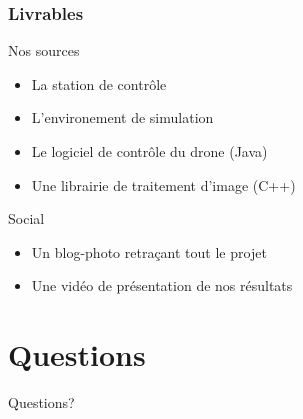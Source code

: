 \documentclass[transparent]{beamer}
\begin{document}
\begin{frame}
\frametitle{Livrables}
	\begin{block}{Nos sources}
			\begin{itemize}
				\item La station de contrôle
				\item L'environement de simulation
				\item Le logiciel de contrôle du drone (Java)
				\item Une librairie de traitement d'image (C++)
			\end{itemize}
	\end{block}
	\begin{block}{Social}
			\begin{itemize}
				\item Un blog-photo retraçant tout le projet
				\item Une vidéo de présentation de nos résultats
			\end{itemize}
	\end{block}

\end{frame}

\section{Questions}

\begin{frame}[plain]
\begin{center}
\Huge Questions?
\end{center}
\end{frame} 
\end{document}
